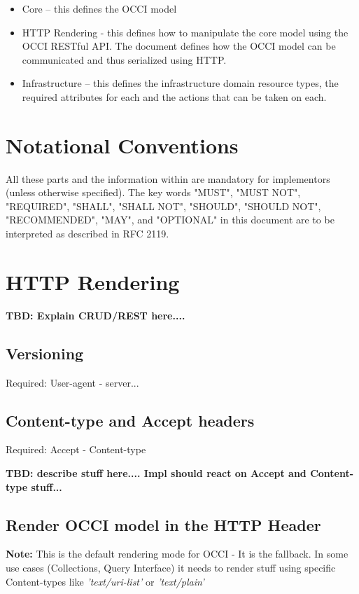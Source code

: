 \documentclass[10pt,a4paper]{article}
\begin{document}
\begin{itemize}
\item Core – this defines the OCCI model
\item HTTP Rendering - this defines how to manipulate the core model using the OCCI RESTful API. The document defines how the OCCI model can be communicated and thus serialized using HTTP.
\item Infrastructure – this defines the infrastructure domain resource types, the required attributes for each and the actions that can be taken on each.
\end{itemize}

\section{Notational Conventions}

All these parts and the information within are mandatory for implementors (unless otherwise specified). The key words "MUST", "MUST NOT", "REQUIRED", "SHALL", "SHALL NOT", "SHOULD", "SHOULD NOT", "RECOMMENDED", "MAY", and "OPTIONAL" in this document are to be interpreted as described in RFC 2119. 

\section{HTTP Rendering}

\textbf{TBD: Explain CRUD/REST here....}

\subsection{Versioning}

Required: User-agent - server...

\subsection{Content-type and Accept headers}

Required: Accept - Content-type

\textbf{TBD: describe stuff here.... Impl should react on Accept and Content-type stuff...}

\subsection{Render OCCI model in the HTTP Header}

\textbf{Note:} This is the default rendering mode for OCCI - It is the fallback. In some use cases (Collections, Query Interface) it needs to render stuff using specific Content-types like \textit{'text/uri-list'} or \textit{'text/plain'}
\end{document}
